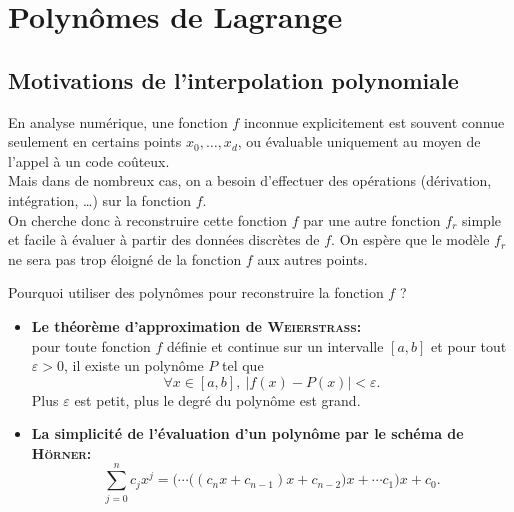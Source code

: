 \section{Polynômes de Lagrange}


\subsection{Motivations de l'interpolation polynomiale}
En analyse numérique, une fonction $f$ inconnue explicitement est souvent connue seulement en certains points $x_0, \dots, x_d$, ou évaluable uniquement au moyen de l'appel à un code coûteux. \\
Mais dans de nombreux cas, on a besoin d'effectuer des opérations (dérivation, intégration, \dots) sur la fonction $f$. \\
On cherche donc à reconstruire cette fonction $f$ par une autre fonction $f_r$ simple et facile à évaluer à partir des données discrètes de $f$. On espère que le modèle $f_r$ ne sera pas trop éloigné de la fonction $f$ aux autres points.
\begin{center}
    Pourquoi utiliser des polynômes pour reconstruire la fonction $f$ ?    
\end{center}
\begin{itemize}
    \item \textbf{Le théorème d'approximation de \textsc{Weierstrass}:} \note \\
    pour toute fonction $f$ définie et continue sur un intervalle $[a, b]$ et pour tout $\varepsilon > 0$, il existe un polynôme $P$ tel que 
    $$\forall x \in [a, b],\ |f(x) - P(x)| < \varepsilon.$$
    Plus $\varepsilon$ est petit, plus le degré du polynôme est grand.
    \item \textbf{La simplicité de l'évaluation d'un polynôme par le schéma de \textsc{Hörner}:}
    $$\sum_{j=0}^n c_j x^j = \Big( \cdots \big( (c_n x + c_{n-1})x + c_{n-2} \big)x + \cdots c_1 \Big)x + c_0.$$
\end{itemize}

\begin{marginfigure}[-1cm]
    \centering
    
\end{marginfigure}

